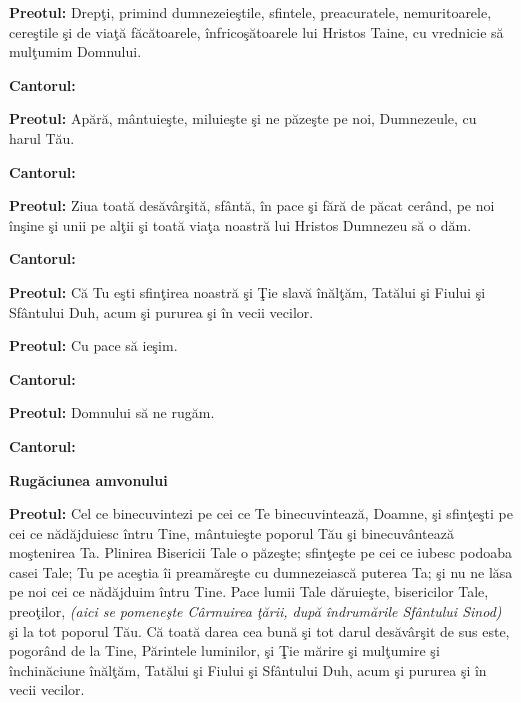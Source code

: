 \documentclass[11pt,letterpaper]{book} \usepackage{ucs}
\newcommand{\mysection}[1]{\begin{center}{\Large \bf #1}\end{center}}
\begin{document}
  {\bf Preotul:} Drepţi, primind dumnezeieştile, sfintele,
  preacuratele, nemuritoarele, cereştile şi de viaţă făcătoarele,
  înfricoşătoarele lui Hristos Taine, cu vrednicie să mulţumim
  Domnului.

  {\bf Cantorul:}
  \begin{center}
  \end{center}

  {\bf Preotul:} Apără, mântuieşte, miluieşte şi ne păzeşte pe noi,
  Dumnezeule, cu harul Tău.

  {\bf Cantorul:}
  \begin{center}
  \end{center}

  {\bf Preotul:} Ziua toată desăvârşită, sfântă, în pace şi fără de
  păcat cerând, pe noi înşine şi unii pe alţii şi toată viaţa noastră
  lui Hristos Dumnezeu să o dăm.

  {\bf Cantorul:}
  \begin{center}
  \end{center}

  {\bf Preotul:} Că Tu eşti sfinţirea noastră şi Ţie slavă înălţăm,
  Tatălui şi Fiului şi Sfântului Duh, acum şi pururea şi în vecii
  vecilor.

  \begin{center}
  \end{center}

  {\bf Preotul:} Cu pace să ieşim.

  {\bf Cantorul:}
  \begin{center}
  \end{center}

  {\bf Preotul:} Domnului să ne rugăm.

  {\bf Cantorul:}
  \begin{center}
  \end{center}

  \mysection{Rugăciunea amvonului}

  {\bf Preotul:} Cel ce binecuvintezi pe cei ce Te binecuvintează,
  Doamne, şi sfinţeşti pe cei ce nădăjduiesc întru Tine, mântuieşte
  poporul Tău şi binecuvântează moştenirea Ta. Plinirea Bisericii Tale
  o păzeşte; sfinţeşte pe cei ce iubesc podoaba casei Tale; Tu pe
  aceştia îi preamăreşte cu dumnezeiască puterea Ta; şi nu ne lăsa pe
  noi cei ce nădăjduim întru Tine. Pace lumii Tale dăruieşte,
  bisericilor Tale, preoţilor, {\em (aici se pomeneşte Cârmuirea ţării,
  după îndrumările Sfântului Sinod)} şi la tot poporul Tău. Că toată
  darea cea bună şi tot darul desăvârşit de sus este, pogorând de la
  Tine, Părintele luminilor, şi Ţie mărire şi mulţumire şi
  închinăciune înălţăm, Tatălui şi Fiului şi Sfântului Duh, acum şi
  pururea şi în vecii vecilor.
\end{document}
